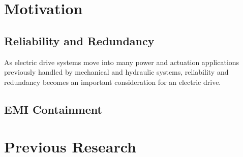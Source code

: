 \section{Motivation}


\subsection{Reliability and Redundancy}
As electric drive systems move into many power and actuation applications
previously handled by mechanical and hydraulic systems, reliability and
redundancy becomes an important consideration for an electric drive.


\subsection{EMI Containment}


\section{Previous Research}

